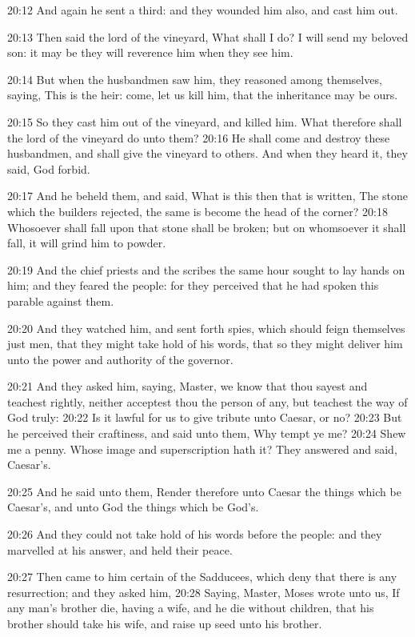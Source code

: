 20:12 And again he sent a third: and they wounded him also, and cast
him out.

20:13 Then said the lord of the vineyard, What shall I do? I will send
my beloved son: it may be they will reverence him when they see him.

20:14 But when the husbandmen saw him, they reasoned among themselves,
saying, This is the heir: come, let us kill him, that the inheritance
may be ours.

20:15 So they cast him out of the vineyard, and killed him. What
therefore shall the lord of the vineyard do unto them?  20:16 He shall
come and destroy these husbandmen, and shall give the vineyard to
others. And when they heard it, they said, God forbid.

20:17 And he beheld them, and said, What is this then that is written,
The stone which the builders rejected, the same is become the head of
the corner?  20:18 Whosoever shall fall upon that stone shall be
broken; but on whomsoever it shall fall, it will grind him to powder.

20:19 And the chief priests and the scribes the same hour sought to
lay hands on him; and they feared the people: for they perceived that
he had spoken this parable against them.

20:20 And they watched him, and sent forth spies, which should feign
themselves just men, that they might take hold of his words, that so
they might deliver him unto the power and authority of the governor.

20:21 And they asked him, saying, Master, we know that thou sayest and
teachest rightly, neither acceptest thou the person of any, but
teachest the way of God truly: 20:22 Is it lawful for us to give
tribute unto Caesar, or no?  20:23 But he perceived their craftiness,
and said unto them, Why tempt ye me?  20:24 Shew me a penny. Whose
image and superscription hath it? They answered and said, Caesar's.

20:25 And he said unto them, Render therefore unto Caesar the things
which be Caesar's, and unto God the things which be God's.

20:26 And they could not take hold of his words before the people: and
they marvelled at his answer, and held their peace.

20:27 Then came to him certain of the Sadducees, which deny that there
is any resurrection; and they asked him, 20:28 Saying, Master, Moses
wrote unto us, If any man's brother die, having a wife, and he die
without children, that his brother should take his wife, and raise up
seed unto his brother.

